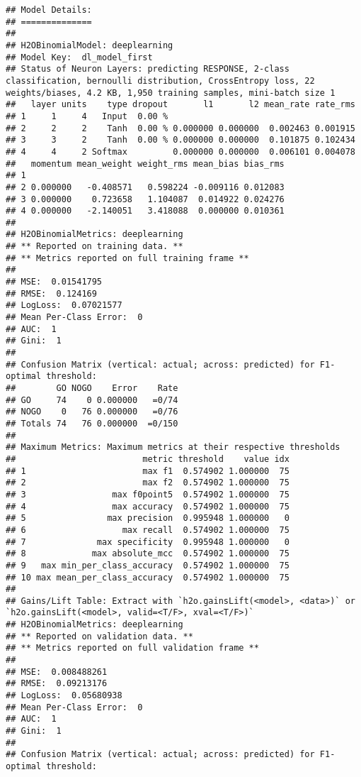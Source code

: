 \documentclass[]{article}
\begin{document}
\begin{verbatim}
## Model Details:
## ==============
## 
## H2OBinomialModel: deeplearning
## Model Key:  dl_model_first 
## Status of Neuron Layers: predicting RESPONSE, 2-class classification, bernoulli distribution, CrossEntropy loss, 22 weights/biases, 4.2 KB, 1,950 training samples, mini-batch size 1
##   layer units    type dropout       l1       l2 mean_rate rate_rms
## 1     1     4   Input  0.00 %                                     
## 2     2     2    Tanh  0.00 % 0.000000 0.000000  0.002463 0.001915
## 3     3     2    Tanh  0.00 % 0.000000 0.000000  0.101875 0.102434
## 4     4     2 Softmax         0.000000 0.000000  0.006101 0.004078
##   momentum mean_weight weight_rms mean_bias bias_rms
## 1                                                   
## 2 0.000000   -0.408571   0.598224 -0.009116 0.012083
## 3 0.000000    0.723658   1.104087  0.014922 0.024276
## 4 0.000000   -2.140051   3.418088  0.000000 0.010361
## 
## H2OBinomialMetrics: deeplearning
## ** Reported on training data. **
## ** Metrics reported on full training frame **
## 
## MSE:  0.01541795
## RMSE:  0.124169
## LogLoss:  0.07021577
## Mean Per-Class Error:  0
## AUC:  1
## Gini:  1
## 
## Confusion Matrix (vertical: actual; across: predicted) for F1-optimal threshold:
##        GO NOGO    Error    Rate
## GO     74    0 0.000000   =0/74
## NOGO    0   76 0.000000   =0/76
## Totals 74   76 0.000000  =0/150
## 
## Maximum Metrics: Maximum metrics at their respective thresholds
##                         metric threshold    value idx
## 1                       max f1  0.574902 1.000000  75
## 2                       max f2  0.574902 1.000000  75
## 3                 max f0point5  0.574902 1.000000  75
## 4                 max accuracy  0.574902 1.000000  75
## 5                max precision  0.995948 1.000000   0
## 6                   max recall  0.574902 1.000000  75
## 7              max specificity  0.995948 1.000000   0
## 8             max absolute_mcc  0.574902 1.000000  75
## 9   max min_per_class_accuracy  0.574902 1.000000  75
## 10 max mean_per_class_accuracy  0.574902 1.000000  75
## 
## Gains/Lift Table: Extract with `h2o.gainsLift(<model>, <data>)` or `h2o.gainsLift(<model>, valid=<T/F>, xval=<T/F>)`
## H2OBinomialMetrics: deeplearning
## ** Reported on validation data. **
## ** Metrics reported on full validation frame **
## 
## MSE:  0.008488261
## RMSE:  0.09213176
## LogLoss:  0.05680938
## Mean Per-Class Error:  0
## AUC:  1
## Gini:  1
## 
## Confusion Matrix (vertical: actual; across: predicted) for F1-optimal threshold:

\end{verbatim}
\end{document}
